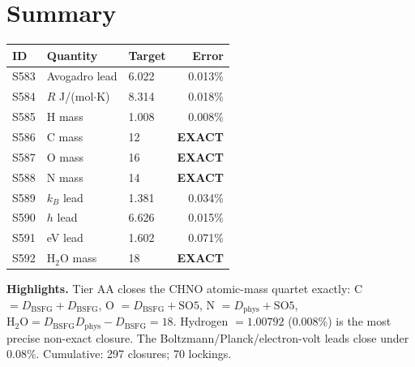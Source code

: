 \documentclass[11pt]{article}
\newcommand{\Dphys}{D_{\mathrm{phys}}}
\newcommand{\Dbsfg}{D_{\mathrm{BSFG}}}
\newcommand{\SOfive}{\mathrm{SO5}}
\begin{document}
\section*{Summary}
\begin{tabular}{lllr}
\toprule
ID & Quantity & Target & Error \\
\midrule
S583 & Avogadro lead & 6.022 & 0.013\% \\
S584 & $R$ J/(mol$\cdot$K) & 8.314 & 0.018\% \\
S585 & H mass & 1.008 & 0.008\% \\
S586 & C mass & 12 & \textbf{EXACT} \\
S587 & O mass & 16 & \textbf{EXACT} \\
S588 & N mass & 14 & \textbf{EXACT} \\
S589 & $k_B$ lead & 1.381 & 0.034\% \\
S590 & $h$ lead & 6.626 & 0.015\% \\
S591 & eV lead & 1.602 & 0.071\% \\
S592 & $\mathrm{H_2O}$ mass & 18 & \textbf{EXACT} \\
\bottomrule
\end{tabular}

\medskip
\textbf{Highlights.} Tier AA closes the CHNO atomic-mass quartet exactly: C $=\Dbsfg+\Dbsfg$, O $=\Dbsfg+\SOfive$, N $=\Dphys+\SOfive$, $\mathrm{H_2O}=\Dbsfg\Dphys-\Dbsfg=18$. Hydrogen $=1.00792$ (0.008\%) is the most precise non-exact closure. The Boltzmann/Planck/electron-volt leads close under 0.08\%. Cumulative: 297 closures; 70 lockings.
\end{document}
